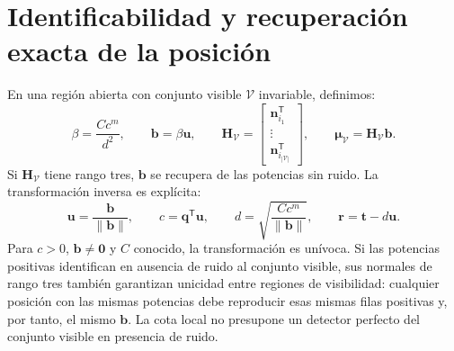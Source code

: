 \documentclass[11pt,a4paper]{article}
\begin{document}
\section{Identificabilidad y recuperación exacta de la posición}
En una región abierta con conjunto visible $\mathcal V$ invariable, definimos:
\begin{equation}
\beta=\frac{C c^m}{d^2},\qquad \mathbf b=\beta\mathbf u,\qquad
\mathbf H_{\mathcal V}=\begin{bmatrix}\mathbf n_{i_1}^{\mathsf T}\\\vdots\\\mathbf n_{i_{|\mathcal V|}}^{\mathsf T}\end{bmatrix},\qquad
\bm\mu_{\mathcal V}=\mathbf H_{\mathcal V}\mathbf b.
\label{eq:linear}
\end{equation}
Si $\mathbf H_{\mathcal V}$ tiene rango tres, $\mathbf b$ se recupera de las potencias sin ruido. La transformación inversa es explícita:
\begin{equation}
\mathbf u=\frac{\mathbf b}{\|\mathbf b\|},\qquad
c=\mathbf q^{\mathsf T}\mathbf u,\qquad
d=\sqrt{\frac{C c^m}{\|\mathbf b\|}},\qquad
\mathbf r=\mathbf t-d\mathbf u.
\label{eq:inverse}
\end{equation}
Para $c>0$, $\mathbf b\ne\mathbf0$ y $C$ conocido, la transformación es unívoca. Si las potencias positivas identifican en ausencia de ruido al conjunto visible, sus normales de rango tres también garantizan unicidad entre regiones de visibilidad: cualquier posición con las mismas potencias debe reproducir esas mismas filas positivas y, por tanto, el mismo $\mathbf b$. La cota local no presupone un detector perfecto del conjunto visible en presencia de ruido.
\end{document}
